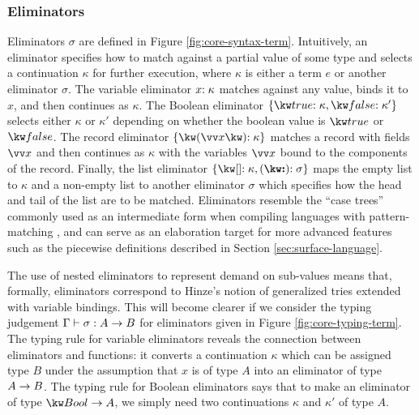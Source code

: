 


\noindent

\subsubsection{Eliminators}
\label{sssec:syntax-eliminator}
Eliminators $\sigma$ are defined in Figure \ref{fig:core-syntax-term}. Intuitively, an eliminator specifies how to match against a partial value of some type and selects a continuation $\kappa$ for further execution, where $\kappa$ is either a term $e$ or another eliminator $\sigma$. The variable eliminator ${x}{:}\;{\kappa}$ matches against any value, binds it to $x$, and then continues as $\kappa$. The Boolean eliminator $\elimBool{\kappa}{\kappa'}$ selects either $\kappa$ or $\kappa'$ depending on whether the boolean value is $\exTrue$ or $\exFalse$. The record eliminator $\elimRec{\seq{x}}{\kappa}$ matches a record with fields $\seq{x}$ and then continues as $\kappa$ with the variables $\seq{x}$ bound to the components of the record. Finally, the list eliminator $\elimList{\kappa}{\sigma}$ maps the empty list to $\kappa$ and a non-empty list to another eliminator $\sigma$ which specifies how the head and tail of the list are to be matched. Eliminators resemble the ``case trees'' commonly used as an intermediate form when compiling languages with pattern-matching \cite{graf20}, and can serve as an elaboration target for more advanced features such as the piecewise definitions described in Section \ref{sec:surface-language}.

The use of nested eliminators to represent demand on sub-values means that, formally, eliminators correspond to Hinze's notion of generalized tries \cite{hinze00} extended with variable bindings. This will become clearer if we consider the typing judgement $\Gamma \vdash \sigma: {A}\rightarrow{B}$ for eliminators given in Figure \ref{fig:core-typing-term}. The typing rule for variable eliminators reveals the connection between eliminators and functions: it converts a continuation $\kappa$ which can be assigned type $B$ under the assumption that $x$ is of type $A$ into an eliminator of type ${A}\rightarrow{B}$. The typing rule for Boolean eliminators says that to make an eliminator of type $\tyFun{\tyBool}{A}$, we simply need two continuations $\kappa$ and $\kappa'$ of type $A$. 

